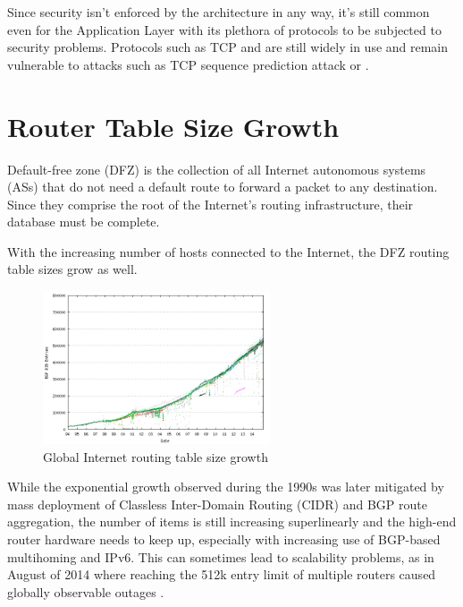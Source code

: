         Since security isn't enforced by the architecture in any way, it's still common even for the Application Layer with its plethora of protocols to be subjected to security problems. Protocols such as TCP and are still widely in use and remain vulnerable to attacks such as TCP sequence prediction attack \cite{rfc1948} or .


    \section{Router Table Size Growth}

        Default-free zone (DFZ) is the collection of all Internet autonomous systems (ASs) that do not need a default route to forward a packet to any destination. Since they comprise the root of the Internet's routing infrastructure, their database must be complete.

        With the increasing number of hosts connected to the Internet, the DFZ routing table sizes grow as well.

        \begin{figure}[H]
            \begin{center}
                \includegraphics[width=0.6\textwidth]{fig/problems_bgp-growth.png}
              \caption{Global Internet routing table size growth \cite{bgpgrow}}
              \label{fig:bgp-growth}
            \end{center}
        \end{figure}


        While the exponential growth observed during the 1990s was later mitigated by mass deployment of Classless Inter-Domain Routing (CIDR) and BGP route aggregation, the number of items is still increasing superlinearly and the high-end router hardware needs to keep up, especially with increasing use of BGP-based multihoming and IPv6. This can sometimes lead to scalability problems, as in August of 2014 where reaching the 512k entry limit of multiple routers caused globally observable outages \cite{512k_day}.

